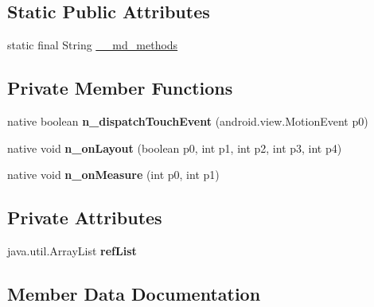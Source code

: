 \subsection*{Static Public Attributes}
\begin{DoxyCompactItemize}
\item 
static final String \hyperlink{classmd5b60ffeb829f638581ab2bb9b1a7f4f3f_1_1PlatformRenderer_ab4ebc79b3f389fb8fc2cf5953db2bf42}{\+\_\+\+\_\+md\+\_\+methods}
\end{DoxyCompactItemize}
\subsection*{Private Member Functions}
\begin{DoxyCompactItemize}
\item 
\mbox{\label{classmd5b60ffeb829f638581ab2bb9b1a7f4f3f_1_1PlatformRenderer_a33089c37f5c6ec94de8506358b5cd98b}} 
native boolean {\bfseries n\+\_\+dispatch\+Touch\+Event} (android.\+view.\+Motion\+Event p0)
\item 
\mbox{\label{classmd5b60ffeb829f638581ab2bb9b1a7f4f3f_1_1PlatformRenderer_ae7e16c9b10a5745eb0b67775d46a9f2b}} 
native void {\bfseries n\+\_\+on\+Layout} (boolean p0, int p1, int p2, int p3, int p4)
\item 
\mbox{\label{classmd5b60ffeb829f638581ab2bb9b1a7f4f3f_1_1PlatformRenderer_a05c8d5168fd42d9017bd758865451741}} 
native void {\bfseries n\+\_\+on\+Measure} (int p0, int p1)
\end{DoxyCompactItemize}
\subsection*{Private Attributes}
\begin{DoxyCompactItemize}
\item 
\mbox{\label{classmd5b60ffeb829f638581ab2bb9b1a7f4f3f_1_1PlatformRenderer_ad7349c32d4b68a5a1ca844cd7439dcaa}} 
java.\+util.\+Array\+List {\bfseries ref\+List}
\end{DoxyCompactItemize}


\subsection{Member Data Documentation}
\mbox{\label{classmd5b60ffeb829f638581ab2bb9b1a7f4f3f_1_1PlatformRenderer_ab4ebc79b3f389fb8fc2cf5953db2bf42}} 
